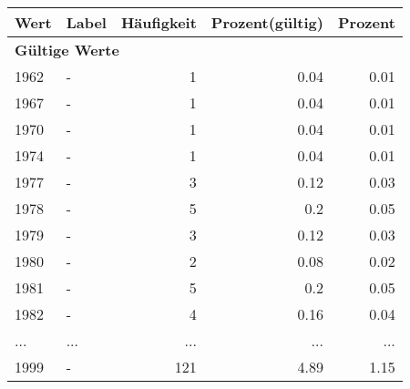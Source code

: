      \begin{longtable}{lXrrr}
     \toprule
     \textbf{Wert} & \textbf{Label} & \textbf{Häufigkeit} & \textbf{Prozent(gültig)} & \textbf{Prozent} \\
     \endhead
     \midrule
     \multicolumn{5}{l}{\textbf{Gültige Werte}}\\
        1962 & \multicolumn{1}{X}{-} & %
          \num{1} &
          \num[round-mode=places,round-precision=2]{0,04} &
          \num[round-mode=places,round-precision=2]{0,01} \\
        1967 & \multicolumn{1}{X}{-} & %
          \num{1} &
          \num[round-mode=places,round-precision=2]{0,04} &
          \num[round-mode=places,round-precision=2]{0,01} \\
        1970 & \multicolumn{1}{X}{-} & %
          \num{1} &
          \num[round-mode=places,round-precision=2]{0,04} &
          \num[round-mode=places,round-precision=2]{0,01} \\
        1974 & \multicolumn{1}{X}{-} & %
          \num{1} &
          \num[round-mode=places,round-precision=2]{0,04} &
          \num[round-mode=places,round-precision=2]{0,01} \\
        1977 & \multicolumn{1}{X}{-} & %
          \num{3} &
          \num[round-mode=places,round-precision=2]{0,12} &
          \num[round-mode=places,round-precision=2]{0,03} \\
        1978 & \multicolumn{1}{X}{-} & %
          \num{5} &
          \num[round-mode=places,round-precision=2]{0,2} &
          \num[round-mode=places,round-precision=2]{0,05} \\
        1979 & \multicolumn{1}{X}{-} & %
          \num{3} &
          \num[round-mode=places,round-precision=2]{0,12} &
          \num[round-mode=places,round-precision=2]{0,03} \\
        1980 & \multicolumn{1}{X}{-} & %
          \num{2} &
          \num[round-mode=places,round-precision=2]{0,08} &
          \num[round-mode=places,round-precision=2]{0,02} \\
        1981 & \multicolumn{1}{X}{-} & %
          \num{5} &
          \num[round-mode=places,round-precision=2]{0,2} &
          \num[round-mode=places,round-precision=2]{0,05} \\
        1982 & \multicolumn{1}{X}{-} & %
          \num{4} &
          \num[round-mode=places,round-precision=2]{0,16} &
          \num[round-mode=places,round-precision=2]{0,04} \\
       ... & ... & ... & ... & ... \\
        1999 & \multicolumn{1}{X}{-} & %
          \num{121} &
          \num[round-mode=places,round-precision=2]{4,89} &
          \num[round-mode=places,round-precision=2]{1,15} \\


\end{longtable}
